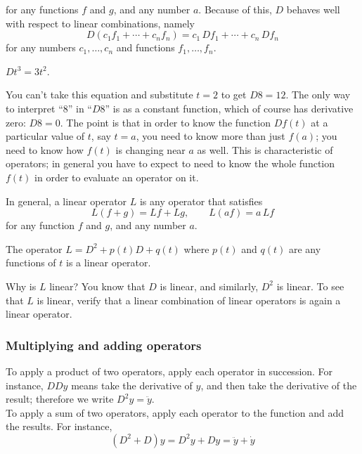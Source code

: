 for any functions $f$ and $g$, and any number $a$. Because of this, $D$
behaves well with respect to linear combinations, namely
\begin{equation*}
  D(c_1 f_1 + \cdots + c_ n f_ n) = c_1 \,  D f_1 + \cdots + c_ n \,  Df_ n
\end{equation*}
for any numbers $c_1,\ldots ,c_ n$ and functions $f_1,\ldots ,f_ n$.

\begin{example}
  $Dt^3 = 3t^2$. 
\end{example}

\Warning You can't take this equation and substitute $t = 2$ to get $D8 = 12$.
The only way to interpret ``8'' in ``$D8$'' is as a constant function,
which of course has derivative zero: $D8 = 0$.
The point is that in order to know the function $Df(t)$ at a particular value of $t$,
say $t = a$, you need to know more than just $f(a)$;
you need to know how $f(t)$ is changing near $a$ as well.
This is characteristic of operators;
in general you have to expect to need to know the whole function $f(t)$ in order to evaluate an operator on it.

\begin{mydef}
  In general, a linear operator $L$ is any operator that satisfies
  \begin{equation*}
    L(f+g) = Lf + Lg, \qquad L(af) = a\, Lf
  \end{equation*}
  for any function $f$ and $g$, and any number $a$. 
\end{mydef}

\begin{example}
  The operator $L = D^2 + p(t)D + q(t)$ where $p(t)$ and $q(t)$ are
  any functions of $t$ is a linear operator. 
\end{example}
Why is $L$ linear? You know that $D$ is linear, and similarly, $D^2$ is linear.
To see that $L$ is linear, verify that a linear combination of linear operators is again a linear operator.

\clearpage
\subsubsection{Multiplying and adding operators}
To apply a product of two operators, apply each operator in succession.
For instance, $DDy$ means take the derivative of $y$, and then take the derivative of the result;
therefore we write $D ^2 y = \ddot{y}$.\\

To apply a sum of two operators, apply each operator to the function and add the results.
For instance,
\begin{equation*}
  (D^2 + D) y = D^2 y + D y = \ddot{y} + \dot{y}
\end{equation*}

